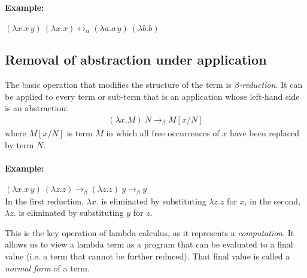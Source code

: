 \documentclass[11pt,twoside,a4paper]{article} %
\begin{document}
\paragraph{Example:} $(\lambda x.x\,y)\ (\lambda x.x)\longleftrightarrow_\alpha(\lambda
a.a\,y)\ (\lambda b.b)$

\subsection{Removal of abstraction under application}\label{beta-reduction}

The basic operation that modifies the structure of the term is
\emph{$\beta$-reduction}. It can be applied to every term or sub-term that is
an application whose left-hand side is an abstraction:
\begin{align*}
(\lambda x.M)\ N\longrightarrow_\beta M[x/N]
\end{align*}
where $M[x/N]$ is term $M$ in which all free occurrences of $x$ have been
replaced by term $N$.

\paragraph{Example:} $(\lambda x.x\,y)\ (\lambda z.z)\longrightarrow_\beta
(\lambda z.z)\ y\longrightarrow_\beta y$\\
In the first reduction, $\lambda x.$ is eliminated by substituting $\lambda z.z$ 
for $x$, in the second, $\lambda z.$ is eliminated by substituting $y$ for $z$.

This is the key operation of lambda calculus, as it represents a
\emph{computation}. It allows us to view a lambda term as a program that can be
evaluated to a final value (i.e. a term that cannot be further reduced). That
final value is called a \emph{normal form} of a term.
\end{document}

